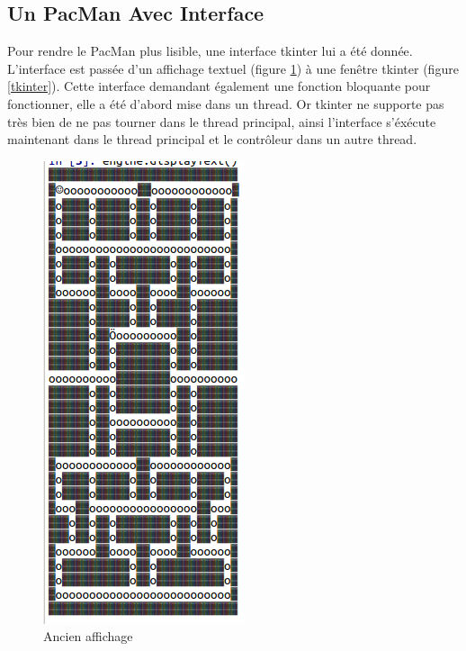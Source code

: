 \documentclass[11pt]{article}
\begin{document}
\clearpage
\subsection{Un PacMan Avec Interface}
\label{sec-3-4}
Pour rendre le PacMan plus lisible, une interface tkinter lui a été donnée. L'interface est passée d'un affichage textuel (figure \ref{texte}) à une fenêtre tkinter (figure \ref{tkinter}).
Cette interface demandant également une fonction bloquante pour fonctionner, elle a été d'abord mise dans un thread.
Or tkinter ne supporte pas très bien de ne pas tourner dans le thread principal, ainsi l'interface s'éxécute maintenant dans le thread principal et le contrôleur dans un autre thread.


\begin{figure}[htb]
\centering
\includegraphics[width=.4\textwidth]{./img/AffichageTexte.png}
\caption{\label{texte}Ancien affichage}
\end{figure}
\end{document}

